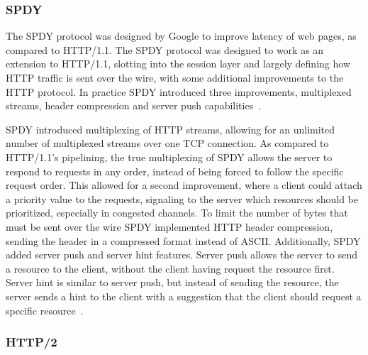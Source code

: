 \documentclass[english, 12pt, a4paper, elec, utf8, a-2b, online]{aaltothesis}
\begin{document}
\subsubsection{SPDY}

The SPDY protocol was designed by Google to improve latency of web pages, as compared
to HTTP/1.1. The SPDY protocol was designed to work as an extension to HTTP/1.1,
slotting into the session layer and largely defining how HTTP traffic is sent over the
wire, with some additional improvements to the HTTP protocol. In practice SPDY
introduced three improvements, multiplexed streams, header compression and server push capabilities~\cite{spdy}.

SPDY introduced multiplexing of HTTP streams, allowing for an unlimited number
of multiplexed streams over one TCP connection. As compared to HTTP/1.1's pipelining,
the true multiplexing of SPDY allows the server to respond to requests in any order,
instead of being forced to follow the specific request order. This allowed for a second improvement,
where a client could attach a priority value to the requests, signaling to the server
which resources should be prioritized, especially in congested channels. To limit
the number of bytes that must be sent over the wire SPDY implemented HTTP header
compression, sending the header in a compressed format instead of ASCII. Additionally,
SPDY added server push and server hint features. Server push allows the server to
send a resource to the client, without the client having request the resource first.
Server hint is similar to server push, but instead of sending the resource, the
server sends a hint to the client with a suggestion that the client should request
a specific resource~\cite{spdy}.
\subsubsection{HTTP/2}
\end{document}
